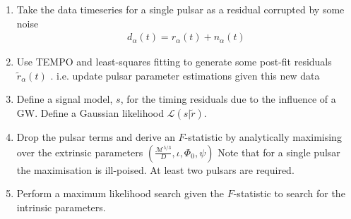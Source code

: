 \documentclass{tufte-handout} %
\begin{document}
\begin{enumerate}
	\item Take the data timeseries for a single pulsar as a residual corrupted by some noise
	\begin{eqnarray}
		d_{\alpha}(t) = r_{\alpha}(t) + n_{\alpha}(t)
	\end{eqnarray}

\item Use TEMPO and least-squares fitting to generate some post-fit residuals $\tilde{r}_{\alpha}(t)$ . i.e. update pulsar parameter estimations given this new data

\item Define a signal model, $s$, for the timing residuals due to the influence of a GW. Define a Gaussian likelihood $\mathcal{L}(s|\tilde{r})$.

\item Drop the pulsar terms and derive an $F$-statistic by analytically maximising over the extrinsic parameters $\left(\frac{\mathcal{M}^{5/3}}{D}, \iota, \Phi_0, \psi \right)$ Note that for a single pulsar the maximisation is ill-poised. At least two pulsars are required. 

\item Perform a maximum likelihood search given the $F$-statistic to search for the intrinsic parameters. 



 
\end{enumerate}
\end{document}
